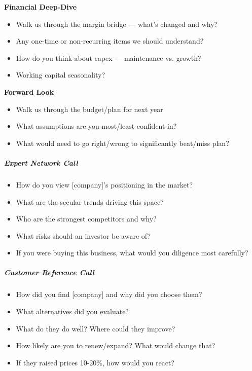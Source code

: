 \documentclass[11pt]{article}
\begin{document}
\textbf{Financial Deep-Dive}

\begin{itemize}[leftmargin=*,itemsep=2pt,topsep=2pt]
\item {} Walk us through the margin bridge — what's changed and why?
\item {} Any one-time or non-recurring items we should understand?
\item {} How do you think about capex — maintenance vs. growth?
\item {} Working capital seasonality?
\end{itemize}

\textbf{Forward Look}

\begin{itemize}[leftmargin=*,itemsep=2pt,topsep=2pt]
\item {} Walk us through the budget/plan for next year
\item {} What assumptions are you most/least confident in?
\item {} What would need to go right/wrong to significantly beat/miss plan?
\end{itemize}

\subparagraph{Expert Network Call}\mbox{}\par
\begin{itemize}[leftmargin=*,itemsep=2pt,topsep=2pt]
\item {} How do you view [company]'s positioning in the market?
\item {} What are the secular trends driving this space?
\item {} Who are the strongest competitors and why?
\item {} What risks should an investor be aware of?
\item {} If you were buying this business, what would you diligence most carefully?
\end{itemize}

\subparagraph{Customer Reference Call}\mbox{}\par
\begin{itemize}[leftmargin=*,itemsep=2pt,topsep=2pt]
\item {} How did you find [company] and why did you choose them?
\item {} What alternatives did you evaluate?
\item {} What do they do well? Where could they improve?
\item {} How likely are you to renew/expand? What would change that?
\item {} If they raised prices 10-20\%, how would you react?
\end{itemize}
\end{document}
